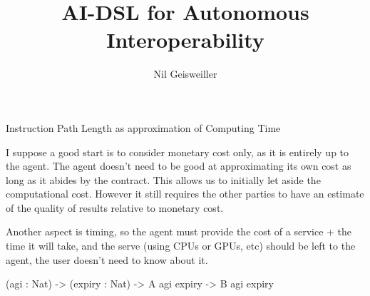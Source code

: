 \documentclass[aspectratio=169]{beamer}
\title{AI-DSL for Autonomous Interoperability}
\author{Nil Geisweiller}
\institute[SingularityNET OpenCog Foundations]
{
  \begin{center}
    SingularityNET \& OpenCog Foundations\\
    \texttt{[image: pics/snet\_oc.png]}
  \end{center}
}
\date[AI-DSL]
\begin{document}
\begin{frame}
  \maketitle
\end{frame}

\begin{frame}
  Instruction Path Length as approximation of Computing Time

  I suppose a good start is to consider monetary cost only, as it is
  entirely up to the agent. The agent doesn't need to be good at
  approximating its own cost as long as it abides by the
  contract. This allows us to initially let aside the computational
  cost. However it still requires the other parties to have an
  estimate of the quality of results relative to monetary cost.

  Another aspect is timing, so the agent must provide the cost of a
  service + the time it will take, and the serve (using CPUs or GPUs,
  etc) should be left to the agent, the user doesn't need to know
  about it.


  (agi : Nat) -> (expiry : Nat) -> A agi expiry -> B agi expiry
\end{frame}
\end{document}
